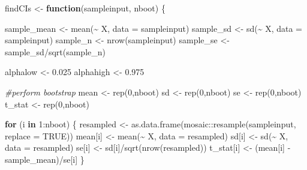 \documentclass[12pt]{article}
\newenvironment{Shaded}{\begin{snugshade}}{\end{snugshade}}
\newcommand{\AttributeTok}[1]{\textcolor[rgb]{0.77,0.63,0.00}{#1}}
\newcommand{\CommentTok}[1]{\textcolor[rgb]{0.56,0.35,0.01}{\textit{#1}}}
\newcommand{\ConstantTok}[1]{\textcolor[rgb]{0.00,0.00,0.00}{#1}}
\newcommand{\ControlFlowTok}[1]{\textcolor[rgb]{0.13,0.29,0.53}{\textbf{#1}}}
\newcommand{\DecValTok}[1]{\textcolor[rgb]{0.00,0.00,0.81}{#1}}
\newcommand{\FloatTok}[1]{\textcolor[rgb]{0.00,0.00,0.81}{#1}}
\newcommand{\FunctionTok}[1]{\textcolor[rgb]{0.00,0.00,0.00}{#1}}
\newcommand{\NormalTok}[1]{#1}
\newcommand{\OtherTok}[1]{\textcolor[rgb]{0.56,0.35,0.01}{#1}}
\newcommand{\SpecialCharTok}[1]{\textcolor[rgb]{0.00,0.00,0.00}{#1}}
\begin{document}
\begin{Shaded}
\begin{Highlighting}[]
\NormalTok{findCIs }\OtherTok{\textless{}{-}} \ControlFlowTok{function}\NormalTok{(sampleinput, nboot) \{}
  
\NormalTok{  sample\_mean }\OtherTok{\textless{}{-}} \FunctionTok{mean}\NormalTok{(}\SpecialCharTok{\textasciitilde{}}\NormalTok{ X, }\AttributeTok{data =}\NormalTok{ sampleinput)}
\NormalTok{  sample\_sd }\OtherTok{\textless{}{-}} \FunctionTok{sd}\NormalTok{(}\SpecialCharTok{\textasciitilde{}}\NormalTok{ X, }\AttributeTok{data =}\NormalTok{ sampleinput)}
\NormalTok{  sample\_n }\OtherTok{\textless{}{-}} \FunctionTok{nrow}\NormalTok{(sampleinput)}
\NormalTok{  sample\_se }\OtherTok{\textless{}{-}}\NormalTok{ sample\_sd}\SpecialCharTok{/}\FunctionTok{sqrt}\NormalTok{(sample\_n)}
  
\NormalTok{  alphalow }\OtherTok{\textless{}{-}} \FloatTok{0.025}
\NormalTok{  alphahigh }\OtherTok{\textless{}{-}} \FloatTok{0.975}
  
  \CommentTok{\#perform bootstrap}
\NormalTok{  mean }\OtherTok{\textless{}{-}} \FunctionTok{rep}\NormalTok{(}\DecValTok{0}\NormalTok{,nboot)}
\NormalTok{  sd }\OtherTok{\textless{}{-}} \FunctionTok{rep}\NormalTok{(}\DecValTok{0}\NormalTok{,nboot)}
\NormalTok{  se }\OtherTok{\textless{}{-}} \FunctionTok{rep}\NormalTok{(}\DecValTok{0}\NormalTok{,nboot)}
\NormalTok{  t\_stat }\OtherTok{\textless{}{-}} \FunctionTok{rep}\NormalTok{(}\DecValTok{0}\NormalTok{,nboot)}

  \ControlFlowTok{for}\NormalTok{ (i }\ControlFlowTok{in} \DecValTok{1}\SpecialCharTok{:}\NormalTok{nboot) \{}
\NormalTok{    resampled }\OtherTok{\textless{}{-}} \FunctionTok{as.data.frame}\NormalTok{(mosaic}\SpecialCharTok{::}\FunctionTok{resample}\NormalTok{(sampleinput, }\AttributeTok{replace =} \ConstantTok{TRUE}\NormalTok{))}
\NormalTok{    mean[i] }\OtherTok{\textless{}{-}} \FunctionTok{mean}\NormalTok{(}\SpecialCharTok{\textasciitilde{}}\NormalTok{ X, }\AttributeTok{data =}\NormalTok{ resampled)}
\NormalTok{    sd[i] }\OtherTok{\textless{}{-}} \FunctionTok{sd}\NormalTok{(}\SpecialCharTok{\textasciitilde{}}\NormalTok{ X, }\AttributeTok{data =}\NormalTok{ resampled)}
\NormalTok{    se[i] }\OtherTok{\textless{}{-}}\NormalTok{ sd[i]}\SpecialCharTok{/}\FunctionTok{sqrt}\NormalTok{(}\FunctionTok{nrow}\NormalTok{(resampled))}
\NormalTok{    t\_stat[i] }\OtherTok{\textless{}{-}}\NormalTok{ (mean[i] }\SpecialCharTok{{-}}\NormalTok{ sample\_mean)}\SpecialCharTok{/}\NormalTok{se[i]}
\NormalTok{  \}}


\end{Highlighting}
\end{Shaded}
\end{document}
